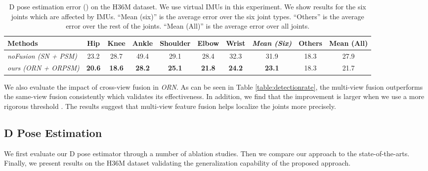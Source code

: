 \documentclass[10pt,twocolumn,letterpaper]{article}
\begin{document}
\begin{table*}[!htbp]
\center
\caption{D pose estimation error () on the H36M dataset. We use virtual IMUs in this experiment.
We show results for the six joints which are affected by IMUs. ``Mean (six)'' is the average error over the six joint types. ``Others'' is the average error over the rest of the joints. ``Mean (All)'' is the average error over all joints.}
\label{table:h36m_mpjpe}
\begin{tabular}{l||ccccccc||c||c}
\toprule
   Methods & Hip  & Knee & Ankle & Shoulder & Elbow & Wrist & \emph{Mean (Six)} & Others & Mean (All)\\ \hline
\emph{noFusion (SN + PSM)} & 23.2	&28.7&	49.4&	29.1&	28.4&	32.3&	31.9&	18.3 & 27.9 \\
\emph{ours (ORN + ORPSM)} & \textbf{20.6}	& \textbf{18.6} &	\textbf{28.2} &	\textbf{25.1} &	\textbf{21.8} &	\textbf{24.2} &	\textbf{23.1} &	18.3 & {21.7} \\
\toprule
\end{tabular}
\end{table*}

We also evaluate the impact of cross-view fusion in \emph{ORN}. As can be seen in Table \ref{table:detectionrate}, the multi-view fusion outperforms the same-view fusion consistently which validates its effectiveness. In addition, we find that the improvement is larger when we use a more rigorous threshold . The results suggest that multi-view feature fusion helps localize the joints more precisely.

\subsection{D Pose Estimation}
We first evaluate our D pose estimator through a number of ablation studies. Then we compare our approach to the state-of-the-arts. Finally, we present results on the H36M dataset validating the generalization capability of the proposed approach.
\end{document}
